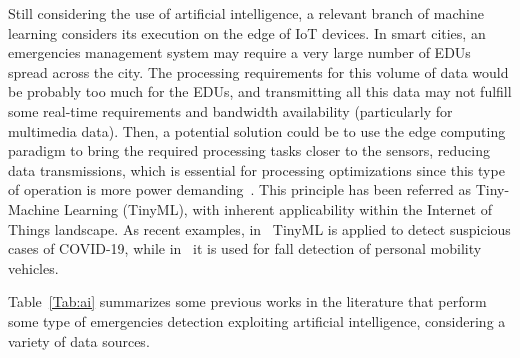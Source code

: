 \begin{refsection}
Still considering the use of artificial intelligence, a relevant branch of machine learning considers its execution on the edge of IoT devices. In smart cities, an emergencies management system may require a very large number of EDUs spread across the city. The processing requirements for this volume of data would be probably too much for the EDUs, and transmitting all this data may not fulfill some real-time requirements and bandwidth availability (particularly for multimedia data). Then, a potential solution could be to use the edge computing paradigm to bring the required processing tasks closer to the sensors, reducing data transmissions, which is essential for processing optimizations since this type of operation is more power demanding~\cite{TinyMachinePavementAnomalies}. This principle has been referred as Tiny-Machine Learning (TinyML), with inherent applicability within the Internet of Things landscape. As recent examples, in~\cite{TinyMachineCovid} TinyML is applied to detect suspicious cases of COVID-19, while in~\cite{TinyMachineFall} it is used for fall detection of personal mobility vehicles.

Table~\ref{Tab:ai} summarizes some previous works in the literature that perform some type of emergencies detection exploiting artificial intelligence, considering a variety of data sources.


\end{refsection}
